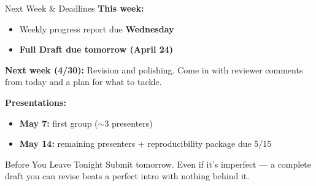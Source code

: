 \begin{frame}{Next Week \& Deadlines}
  \small
  \textbf{This week:}
  \begin{itemize}\setlength\itemsep{0pt}
    \item Weekly progress report due \textbf{Wednesday}
    \item \textbf{\textcolor{usfgreen}{Full Draft due tomorrow (April 24)}}
  \end{itemize}

  \textbf{Next week (4/30):} Revision and polishing. Come in with reviewer comments from today and a plan for what to tackle.

  \textbf{Presentations:}
  \begin{itemize}\setlength\itemsep{0pt}
    \item \textbf{May 7:} first group ($\sim$3 presenters)
    \item \textbf{May 14:} remaining presenters + reproducibility package due 5/15
  \end{itemize}

  \begin{block}{Before You Leave Tonight}
    Submit tomorrow. Even if it's imperfect --- a complete draft you can revise beats a perfect intro with nothing behind it.
  \end{block}
\end{frame}


